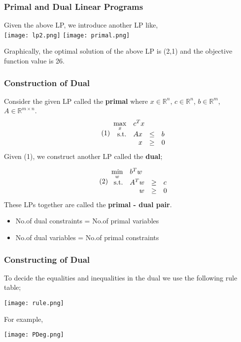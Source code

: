 \documentclass[9pt]{beamer}
\begin{document}
\begin{frame}
\frametitle{Primal and Dual Linear Programs}
Given the above LP, we introduce another LP like, \\

\texttt{[image: lp2.png]}
\hfill\texttt{[image: primal.png]}\\
\vspace{0.2cm}

Graphically, the optimal solution of the above LP is (2,1) and the objective function value is 26. 
\end{frame}

\begin{frame}
\frametitle{Construction of Dual}
Consider the given LP called the \textbf{primal} where $ x \in \mathbb{R}^n $, $ c \in \mathbb{R}^n $, $ b \in \mathbb{R}^m $, $ A \in \mathbb{R}^{m \times n} $.\\
\begin{equation} \tag{1}
\begin{array}{rrclcl}
\displaystyle \max_{x} & \multicolumn{2}{l}{c^T x} \\
\textrm{s.t.} & A x & \leq & b \\
& x & \geq & 0 \\
\end{array}
\end{equation}
Given (1), we construct another LP called the \textbf{dual};

\begin{equation} \tag{2}
\begin{array}{rrclcl}
\displaystyle \min_{w} & \multicolumn{2}{l}{b^T w} \\
\textrm{s.t.} & A^T w & \geq & c \\
& w & \geq & 0 \\
\end{array}
\end{equation}
These LPs together are called the \textbf{primal - dual pair}.

\begin{itemize}
    \item No.of dual constraints = No.of primal variables
    
    \item No.of dual variables = No.of primal constraints
\end{itemize}
\end{frame}

\begin{frame}
\frametitle{Constructing of Dual}
To decide the equalities and inequalities in the dual we use the following rule table;
\begin{center}
\texttt{[image: rule.png]}
\end{center}

For example,
\begin{center}
\texttt{[image: PDeg.png]}
\end{center}
\end{frame}
\end{document}
